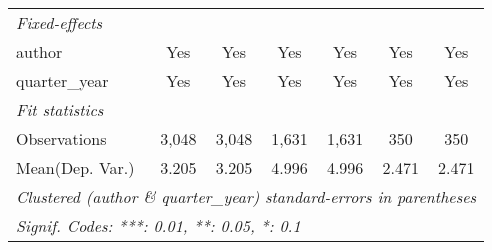 \begin{tabular}{lcccccc}
   \midrule
   \emph{Fixed-effects}\\
   author                                & Yes           & Yes           & Yes         & Yes         & Yes           & Yes\\  
   quarter\_year                         & Yes           & Yes           & Yes         & Yes         & Yes           & Yes\\  
   \midrule
   \emph{Fit statistics}\\
   Observations                          & 3,048         & 3,048         & 1,631       & 1,631       & 350           & 350\\  
Mean(Dep. Var.) & 3.205 & 3.205 & 4.996 & 4.996 & 2.471 & 2.471 \\
   \midrule \midrule
   \multicolumn{7}{l}{\emph{Clustered (author \& quarter\_year) standard-errors in parentheses}}\\
   \multicolumn{7}{l}{\emph{Signif. Codes: ***: 0.01, **: 0.05, *: 0.1}}\\
\end{tabular}
\par\endgroup
